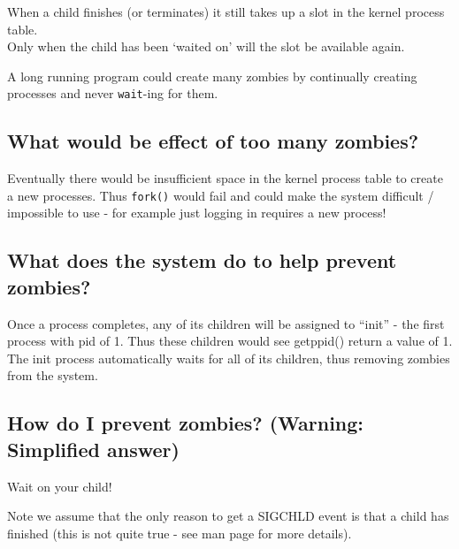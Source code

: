When a child finishes (or terminates) it still takes up a slot in the
kernel process table.\\Only when the child has been `waited on' will the
slot be available again.

A long running program could create many zombies by continually creating
processes and never \texttt{wait}-ing for them.

\subsection{What would be effect of too many
zombies?}\label{what-would-be-effect-of-too-many-zombies}

Eventually there would be insufficient space in the kernel process table
to create a new processes. Thus \texttt{fork()} would fail and could
make the system difficult / impossible to use - for example just logging
in requires a new process!

\subsection{What does the system do to help prevent
zombies?}\label{what-does-the-system-do-to-help-prevent-zombies}

Once a process completes, any of its children will be assigned to
``init'' - the first process with pid of 1. Thus these children would
see getppid() return a value of 1. The init process automatically waits
for all of its children, thus removing zombies from the system.

\subsection{How do I prevent zombies? (Warning: Simplified
answer)}\label{how-do-i-prevent-zombies-warning-simplified-answer}

Wait on your child!

\begin{Shaded}
\begin{Highlighting}[]
\NormalTok{); }
\end{Highlighting}
\end{Shaded}

Note we assume that the only reason to get a SIGCHLD event is that a
child has finished (this is not quite true - see man page for more
details).

